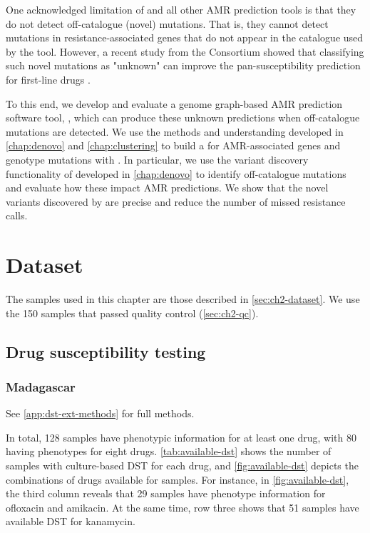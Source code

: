 One acknowledged limitation of \mykrobe{} and all other \mtb{} AMR prediction tools is that they do not detect off-catalogue (novel) mutations. That is, they cannot detect mutations in resistance-associated genes that do not appear in the catalogue used by the tool. However, a recent study from the \cryptic{} Consortium showed that classifying such novel mutations as "unknown" can improve the pan-susceptibility prediction for first-line drugs \cite{cryptic2018}. 

To this end, we develop and evaluate a genome graph-based \mtb{} AMR prediction software tool, \drprg{}, which can produce these unknown predictions when off-catalogue mutations are detected. We use the methods and understanding developed in \autoref{chap:denovo} and \autoref{chap:clustering} to build a \mtb{} \prg{} for AMR-associated genes and genotype mutations with \pandora{}. In particular, we use the \denovo{} variant discovery functionality of \pandora{} developed in \autoref{chap:denovo} to identify off-catalogue mutations and evaluate how these impact AMR predictions. We show that the novel variants discovered by \drprg{} are precise and reduce the number of missed resistance calls.

\section{Dataset}

The \mtb{} samples used in this chapter are those described in \autoref{sec:ch2-dataset}. We use the 150 samples that passed quality control (\autoref{sec:ch2-qc}).

\subsection{Drug susceptibility testing}
\label{sec:dst-methods}


\subsubsection{Madagascar}

See \autoref{app:dst-ext-methods} for full methods.

\noindent
In total, 128 samples have phenotypic information for at least one drug, with 80 having phenotypes for eight drugs. \autoref{tab:available-dst} shows the number of samples with culture-based DST for each drug, and \autoref{fig:available-dst} depicts the combinations of drugs available for samples. For instance, in \autoref{fig:available-dst}, the third column reveals that 29 samples have phenotype information for ofloxacin and amikacin. At the same time, row three shows that 51 samples have available DST for kanamycin. 

